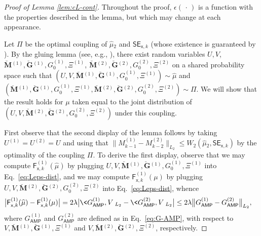 \documentclass[]{article}
\def\sx{{\mathsf x}}
\def\muhat{\widehat{\mu}{}}
\def\AMP{\mathsf{AMP}}
\def\sF{\mathsf{F}}
\def\brevebM{\breve{\boldsymbol{M}}{}}
\def\brevebG{\breve{\boldsymbol{G}}{}}
\def\SE{\mathsf{SE}}
\begin{document}
\begin{proof}[Proof of Lemma \ref{lem:cL-cont}]
    Throughout the proof, $\epsilon(\,\cdot\,)$ is a function with the properties described in the lemma, but which may change at each appearance.

    Let $\Pi$ be the optimal coupling of $\muhat_2$ and $\SE_{\sx,k}$ (whose existence is guaranteed by \cite[Theorem 4.1]{villani2008optimal}).
    By the gluing lemma (see, e.g., \cite[pg.~23]{villani2008optimal}),
    there exist random variables $U,V$, $\brevebM^{(1)},\brevebG^{(1)},G_0^{(1)},\Xi^{(1)}$, $\brevebM^{(2)},\brevebG^{(2)},G_0^{(2)},\Xi^{(2)}$ on a shared probability space such that 
    $(U,V,\brevebM^{(1)},\brevebG^{(1)},G_0^{(1)},\Xi^{(1)}) \sim \muhat$
    and  
    $(\brevebM^{(1)},\brevebG^{(1)},\allowbreak G_0^{(1)},\allowbreak \Xi^{(1)},\allowbreak\brevebM^{(2)},\allowbreak\brevebG^{(2)},G_0^{(2)},\Xi^{(2)}) \sim \Pi$.
    We will show that the result holds for $\mu$ taken equal to the joint distribution of $(U,V,\allowbreak\brevebM^{(2)},\allowbreak\brevebG^{(2)},G_0^{(2)},\Xi^{(2)})$ under this coupling.

    First observe that the second display of the lemma follows by taking $U^{(1)} = U^{(2)} = U$ and using that $\big\| M_{k-1}^{(1)} - M_{k-2}^{(2)} \big\|_{L_2} \leq  W_2(\muhat_2,\SE_{\sx,k})$ by the optimality of the coupling $\Pi$.
    To derive the first display,
    observe that
    we may compute $\sF^{(1)}_{\sx,k}(\muhat)$ by plugging $U,V,\brevebM^{(1)},\brevebG^{(1)},G_0^{(1)},\Xi^{(1)}$ into Eq.~\eqref{eq:Leps-dist},
    and we may compute $\sF^{(1)}_{\sx,k}(\mu)$ by plugging $U,V,\brevebM^{(2)},\brevebG^{(2)},G_0^{(2)},\Xi^{(2)}$ into Eq.~\eqref{eq:Leps-dist},
    whence
    \begin{equation}
    \begin{aligned}
        \big|
                \sF^{(1)}_{\sx,k}(\muhat) - \sF^{(1)}_{\sx,k}(\mu)
            \big|
            &=
            2\lambda \big| \< G_{\AMP}^{(1)} , V \>_{L_2} - \< G_{\AMP}^{(2)} , V \>_{L_2} \big|
            \leq 
            2\lambda \big\| G_{\AMP}^{(1)} - G_{\AMP}^{(2)} \big\|_{L_2},
    \end{aligned}
    \end{equation}
    where $G_{\AMP}^{(1)}$ and $G_{\AMP}^{(2)}$ are defined as in Eq.~\eqref{eq:G-AMP},
    with respect to $V,\brevebM^{(1)},\brevebG^{(1)},\Xi^{(1)}$ and $V,\brevebM^{(2)},\brevebG^{(2)},\Xi^{(2)}$, respectively.


\end{proof}
\end{document}
